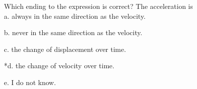 
Which ending to the expression is correct?  The acceleration is\\

a. always in the same direction as the velocity. 

b. never in the same direction as the velocity. 

c. the change of displacement over time.

*d. the change of velocity over time.

e. I do not know. \\
